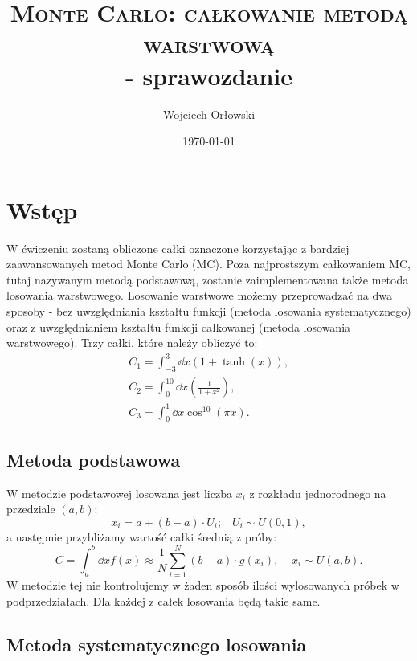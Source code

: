 \documentclass[a4paper, 12pt]{article}
\title{\textsc{Monte Carlo: całkowanie metodą warstwową}\\ - sprawozdanie}
\author{Wojciech Orłowski}
\date{\today}
\begin{document}
    \maketitle

    \section{Wstęp}
    
    W ćwiczeniu zostaną obliczone całki oznaczone korzystając z bardziej zaawansowanych metod Monte Carlo (MC).
    Poza najprostszym całkowaniem MC, tutaj nazywanym metodą podstawową, zostanie zaimplementowana także metoda losowania warstwowego.
    Losowanie warstwowe możemy przeprowadzać na dwa sposoby - bez uwzględniania kształtu funkcji (metoda losowania systematycznego) oraz z uwzględnianiem kształtu funkcji całkowanej (metoda losowania warstwowego).
    Trzy całki, które należy obliczyć to:
    \begin{gather}
        C_1 = \int_{-3}^{3} \dd x \left( 1 + \tanh(x) \right), \\ 
        C_2 = \int_{0}^{10} \dd x \left( \frac{1}{1+x^2} \right), \\ 
        C_3 = \int_{0}^{1} \dd x \cos^{10}(\pi x).
    \end{gather}

    
    \subsection*{Metoda podstawowa} 

    W metodzie podstawowej losowana jest liczba $x_i$ z rozkładu jednorodnego na przedziale $(a,b)$:
    \begin{equation}
        x_i = a + (b-a)\cdot U_i; \; \; \;  U_i \sim U(0,1),
    \end{equation}
    a następnie przybliżamy wartość całki średnią z próby:
    \begin{equation}
        C = \int_{a}^{b} \dd x f(x) \approx \frac{1}{N} \sum_{i=1}^{N} (b-a)\cdot g(x_i), \;\;\;\; x_i \sim U(a,b).
    \end{equation}
    W metodzie tej nie kontrolujemy w żaden sposób ilości wylosowanych próbek w podprzedziałach.
    Dla każdej z całek losowania będą takie same.

    \subsection*{Metoda systematycznego losowania}
\end{document}
